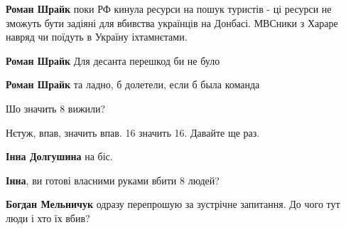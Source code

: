 \begin{itemize}
\begin{itemize}
\textbf{Роман Шрайк} поки РФ кинула ресурси на пошук туристів - ці ресурси не зможуть бути задіяні для вбивства українців на Донбасі.
МВСники з Хараре навряд чи поїдуть в Україну іхтамнєтами.

 
\textbf{Роман Шрайк} Для десанта перешкод би не було

 
\textbf{Роман Шрайк} та ладно, б долетели, если б была команда

\end{itemize}

 
Шо значить 8 вижили?

Нєтуж, впав, значить впав. 16 значить 16. Давайте ще раз.

\begin{itemize}
 
\textbf{Інна Долгушина} на біс.

 
\textbf{Інна}, ви готові власними руками вбити 8 людей?

\begin{itemize}

 
\textbf{Богдан Мельничук} одразу перепрошую за зустрічне запитання.
До чого тут люди і хто їх вбив?

 

\end{itemize}
\end{itemize}
\end{itemize}
